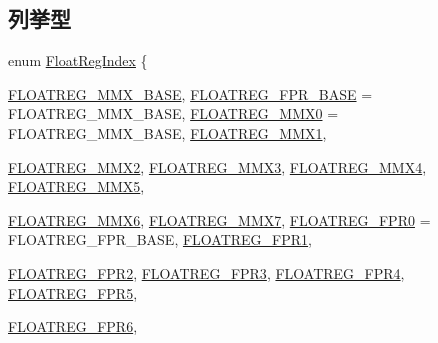 \subsection*{列挙型}
\begin{DoxyCompactItemize}
\item 
enum \hyperlink{namespaceX86ISA_a50e93c80b4d3e47dea8b60bf4b9a4f77}{FloatRegIndex} \{ \par
\hyperlink{namespaceX86ISA_a50e93c80b4d3e47dea8b60bf4b9a4f77a60770fd2d26be972d486657c8044fcbd}{FLOATREG\_\-MMX\_\-BASE}, 
\hyperlink{namespaceX86ISA_a50e93c80b4d3e47dea8b60bf4b9a4f77af15518b7e0f8705dd479e1b92f77d320}{FLOATREG\_\-FPR\_\-BASE} =  FLOATREG\_\-MMX\_\-BASE, 
\hyperlink{namespaceX86ISA_a50e93c80b4d3e47dea8b60bf4b9a4f77a17804c7c888ba9dc29a2b6744768ef07}{FLOATREG\_\-MMX0} =  FLOATREG\_\-MMX\_\-BASE, 
\hyperlink{namespaceX86ISA_a50e93c80b4d3e47dea8b60bf4b9a4f77a8167d9d163827cce74f0bcd35b097085}{FLOATREG\_\-MMX1}, 
\par
\hyperlink{namespaceX86ISA_a50e93c80b4d3e47dea8b60bf4b9a4f77a1d4eb7832bfd7b10977f726473b2b068}{FLOATREG\_\-MMX2}, 
\hyperlink{namespaceX86ISA_a50e93c80b4d3e47dea8b60bf4b9a4f77aa8e93610741f8518e0fdf4ebc9718943}{FLOATREG\_\-MMX3}, 
\hyperlink{namespaceX86ISA_a50e93c80b4d3e47dea8b60bf4b9a4f77a625453d1824c678b32df48924b0c1779}{FLOATREG\_\-MMX4}, 
\hyperlink{namespaceX86ISA_a50e93c80b4d3e47dea8b60bf4b9a4f77a0edc9efd037b075c4468227ce9032751}{FLOATREG\_\-MMX5}, 
\par
\hyperlink{namespaceX86ISA_a50e93c80b4d3e47dea8b60bf4b9a4f77afc995e470e0c81ea50f9f1da88a4eea2}{FLOATREG\_\-MMX6}, 
\hyperlink{namespaceX86ISA_a50e93c80b4d3e47dea8b60bf4b9a4f77acb0e448f6e5fa267cafedda78fdba339}{FLOATREG\_\-MMX7}, 
\hyperlink{namespaceX86ISA_a50e93c80b4d3e47dea8b60bf4b9a4f77aa51de737444926413456550a4a05fdef}{FLOATREG\_\-FPR0} =  FLOATREG\_\-FPR\_\-BASE, 
\hyperlink{namespaceX86ISA_a50e93c80b4d3e47dea8b60bf4b9a4f77aaa76eab543bbf0f55c163672531715fb}{FLOATREG\_\-FPR1}, 
\par
\hyperlink{namespaceX86ISA_a50e93c80b4d3e47dea8b60bf4b9a4f77a522ed2c2eb89f3900c0f76b3d566fd48}{FLOATREG\_\-FPR2}, 
\hyperlink{namespaceX86ISA_a50e93c80b4d3e47dea8b60bf4b9a4f77ab0c03e211d665264595c0ba2e9a701fe}{FLOATREG\_\-FPR3}, 
\hyperlink{namespaceX86ISA_a50e93c80b4d3e47dea8b60bf4b9a4f77ae281486cc6f6232734dcaaa6c5c5a7ed}{FLOATREG\_\-FPR4}, 
\hyperlink{namespaceX86ISA_a50e93c80b4d3e47dea8b60bf4b9a4f77ae7eab4b1a157bc525d8bb26ff09b9a6d}{FLOATREG\_\-FPR5}, 
\par
\hyperlink{namespaceX86ISA_a50e93c80b4d3e47dea8b60bf4b9a4f77a1a5c7730afd035a6137869a386f6fe09}{FLOATREG\_\-FPR6}, 

\end{DoxyCompactItemize}
